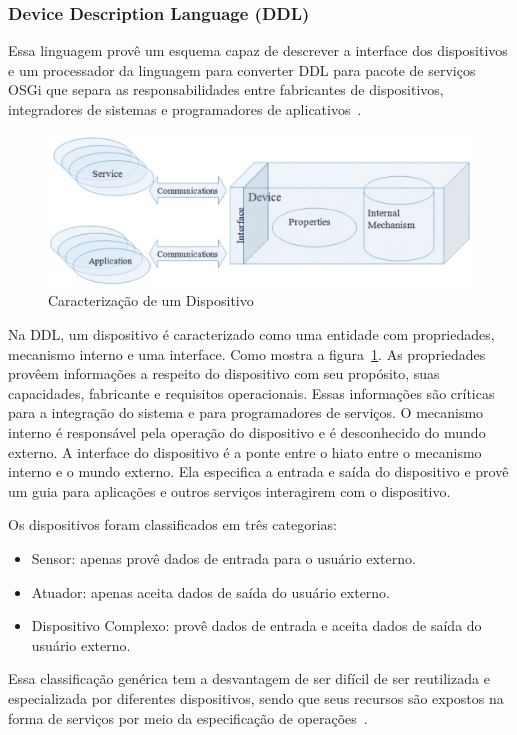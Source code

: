 \subsubsection{Device Description Language (DDL)}
\label{subsec:ddl}

Essa linguagem provê um esquema capaz de descrever a interface dos dispositivos e um processador da linguagem para converter DDL para pacote de serviços OSGi que separa as responsabilidades entre fabricantes de dispositivos, integradores de sistemas e programadores de aplicativos~\cite{gatorTechDDL}.

\begin{figure}[ht]
\center
\includegraphics[scale=0.4]{imagens/gatorDDL}
\caption{Caracterização de um Dispositivo~\cite{ddlSpec}}
\label{fig:ddlspec}
\end{figure}

Na DDL, um dispositivo é caracterizado como uma entidade com propriedades, mecanismo interno e uma interface. Como mostra a figura~\ref{fig:ddlspec}. As propriedades provêem informações a respeito do dispositivo com seu propósito, suas capacidades, fabricante e requisitos operacionais. Essas informações são críticas para a integração do sistema e para programadores de serviços. O mecanismo interno é responsável pela operação do dispositivo e é desconhecido do mundo externo. A interface do dispositivo é a ponte entre o hiato entre o mecanismo interno e o mundo externo. Ela especifica a entrada e saída do dispositivo e provê um guia para aplicações e outros serviços interagirem com o dispositivo.

Os dispositivos foram classificados em três categorias:
\begin{itemize}
	\item Sensor: apenas provê dados de entrada para o usuário externo.
	\item Atuador: apenas aceita dados de saída do usuário externo.
	\item Dispositivo Complexo: provê dados de entrada e aceita dados de saída do usuário externo.
\end{itemize}

Essa classificação genérica tem a desvantagem de ser difícil de ser reutilizada e especializada por diferentes dispositivos, sendo que seus recursos são expostos na forma de serviços por meio da especificação de operações~\cite{ddlSpec}.
